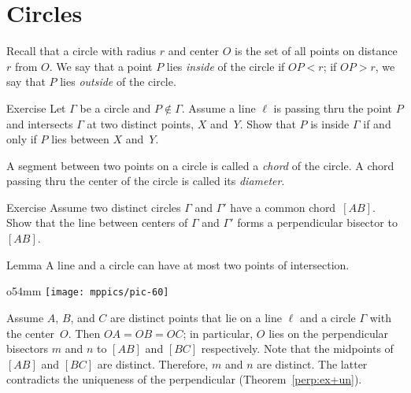 \section*{Circles}

Recall that a circle with radius $r$ and center $O$ is the set of all points on distance $r$ from $O$.
We say that a point $P$ lies \emph{inside} of the circle if $OP<r$; 
if $OP>r$, we say that $P$ lies \emph{outside} of the circle.
\label{def:circle}

\begin{thm}{Exercise}\label{ex:inside-outside}
Let $\Gamma$ be a circle and $P\notin \Gamma$.
Assume a line $\ell$ is passing thru the point $P$
and intersects $\Gamma$ at two distinct points, $X$ and~$Y$.
Show that $P$ is inside $\Gamma$ if and only if $P$ lies between $X$ and~$Y$.
\end{thm}


A segment between two points on a circle is called a \emph{chord} of the circle.
A chord passing thru the center of the circle is called its \emph{diameter}.

\begin{thm}{Exercise}\label{ex:chord-perp}
Assume two distinct circles $\Gamma$ and $\Gamma'$ have a common chord~$[A B]$.
Show that the line between centers of $\Gamma$ and $\Gamma'$ forms a perpendicular bisector to~$[A B]$.
\end{thm}



\begin{thm}[\abs]{Lemma}\label{lem:line-circle}
A line and a circle can have at most two points of intersection.
\end{thm}

\begin{wrapfigure}{o}{54mm}
\vskip-4mm
\centering
\texttt{[image: mppics/pic-60]}
\end{wrapfigure}

 Assume $A$, $B$, and $C$ are distinct points that lie on a line $\ell$ and a circle $\Gamma$ with the center~$O$.
Then $OA=OB=OC$; in particular, $O$ lies on the perpendicular bisectors 
$m$ and $n$ to $[A B]$ and $[B C]$ respectively.
Note that the midpoints of $[AB]$ and $[BC]$ are distinct.
Therefore, $m$ and $n$ are distinct.
The latter contradicts the uniqueness of the perpendicular (Theorem~\ref{perp:ex+un}).
\qeds

